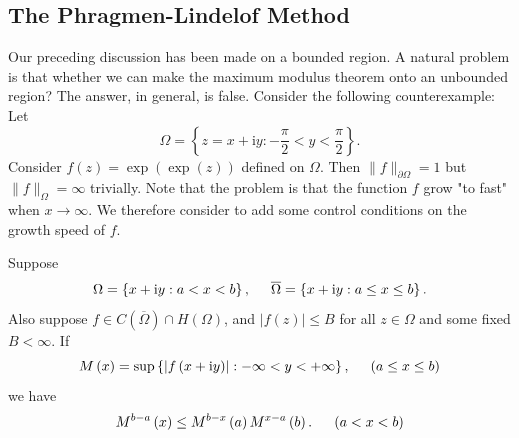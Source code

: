 \subsection{The Phragmen-Lindelof Method}
Our preceding discussion has been made on a bounded region. A natural problem is that whether we can make the maximum modulus theorem onto an unbounded region? The answer, in general, is false. Consider the following counterexample: Let 
$$
\Omega =\left\{ z=x+\mathrm{i}y:-\frac{\pi}{2}<y<\frac{\pi}{2} \right\} .
$$
Consider $f(z)=\exp(\exp(z))$ defined on $\Omega$. Then $\|f\|_{\partial\Omega}=1$ but $\|f\|_\Omega=\infty$ trivially. Note that the problem is that the function $f$ grow "to fast" when $x\to\infty$. We therefore consider to add some control conditions on the growth speed of $f$.
\begin{theorem}
Suppose 
$$
\Omega =\left\{ x+\mathrm{i}y:a<x<b \right\} ,\hspace{0.5cm}\overline{\Omega }=\left\{ x+\mathrm{i}y:a\le x\le b \right\} .
$$
Also suppose $f\in C(\overline{\Omega})\cap H(\Omega)$, and $|f(z)|\le B$ for all $z\in\Omega$ and some fixed $B<\infty$. If 
$$
M\left( x \right) =\mathrm{sup}\left\{ \left| f\left( x+\mathrm{i}y \right) \right|:-\infty <y<+\infty \right\} ,\hspace{0.5cm}\left( a\le x\le b \right) 
$$
we have 
$$
M^{b-a}\left( x \right) \le M^{b-x}\left( a \right) M^{x-a}\left( b \right) .\hspace{0.5cm}\left( a<x<b \right) 
$$
\end{theorem}
